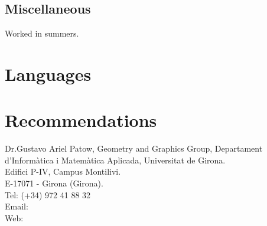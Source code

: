 
\subsection{Miscellaneous}

{
    Worked in summers.
}


\section{Languages}



\section{Recommendations}
    {
        Dr.Gustavo Ariel Patow, Geometry and Graphics Group, Departament d'Inform\`atica i Matem\`atica Aplicada, Universitat de Girona. \\
        Edifici P-IV, Campus Montilivi. \\
        E-17071 - Girona (Girona). \\
        Tel: (+34) 972 41 88 32 \\
        Email:  \\
        Web: 
    }

% 
% 
% 
     
